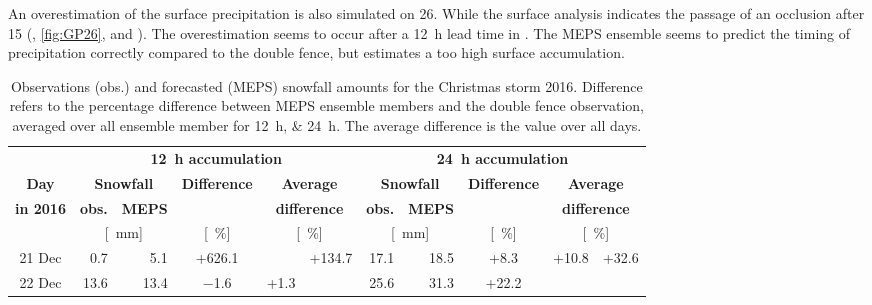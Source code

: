 An overestimation of the surface precipitation is also simulated on \SI{26}{\dec}. While the surface analysis indicates the passage of an occlusion after \SI{15}{\UTC} (, \ref{fig:GP26}, and ). The overestimation seems to occur after a \SI{12}{\hour} lead time in . 
The MEPS ensemble seems to predict the timing of precipitation correctly compared to the double fence, but estimates a too high surface accumulation.
\begin{table}[t]
	\begin{center}
		\caption{Observations (obs.) and forecasted (MEPS) snowfall amounts for the Christmas storm 2016. Difference refers to the percentage difference between MEPS ensemble members and the double fence observation, averaged over all ensemble member for \SIlist{12;24}{\hour}. The average difference is the value over all days.}\label{tab:res:MEPS_err}
		\begin{tabular}{c||r|r|c|c|c||r|r|c|c|c}
			\hline \hline
			& \multicolumn{5}{c||}{\textbf{\SI{12}{\hour} accumulation}} & \multicolumn{5}{c}{\textbf{\SI{24}{\hour} accumulation}}    \\ \cline{2-11}
			\textbf{Day} & \multicolumn{2}{c|}{\textbf{Snowfall}} & \textbf{Difference} & \multicolumn{2}{c||}{\textbf{Average}} &  \multicolumn{2}{c|}{\textbf{Snowfall}} & \textbf{Difference} & \multicolumn{2}{c}{\textbf{Average}}  \\\cline{2-3} \cline{7-8}
			\textbf{in 2016} & \textbf{obs.} & \textbf{MEPS} & & \multicolumn{2}{c||}{\textbf{difference}} & \textbf{obs.} & \textbf{MEPS} & & \multicolumn{2}{c}{\textbf{difference}} \\\cline{2-11}
			& \multicolumn{2}{c|}{[\SI{}{\mm}]} & [\SI{}{\percent}] & \multicolumn{2}{c||}{ [\SI{}{\percent}]} & \multicolumn{2}{c|}{[\SI{}{\mm}]} & [\SI{}{\percent}] & \multicolumn{2}{c}{ [\SI{}{\percent}]} \\ \hline\hline
			\num{21} Dec & \num{0.7} & \num{5.1} & +\num{626.1} &  &\multirow{6}{*}{+\num{134.7}} & \num{17.1} & \num{18.5} & +\num{8.3} & \multirow{3}{*}{+\num{10.8}}& \multirow{6}{*}{+\num{32.6}}   \\\cline{1-5}\cline{7-9} 
			\num{22} Dec & \num{13.6} & \num{13.4} & \num{-1.6} & \multirow{2}{*}{+\num{1.3}} & & \num{25.6} & \num{31.3} & +\num{22.2} &  &  \\\cline{1-4}\cline{7-9}

\end{tabular}
\end{center}
\end{table}
